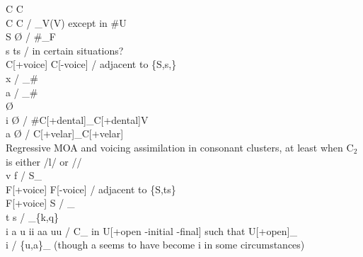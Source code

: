 \documentclass[11pt]{article}
\begin{document}
C\textipa{:} \textrightarrow\hspace{0pt} C \\
C \textrightarrow\hspace{0pt} C\textipa{:} / _V(\textellipsis V) except in \#U \\
S \textrightarrow\hspace{0pt} \O\hspace{0pt} / \#_F \\
s \textrightarrow\hspace{0pt} ts / in certain situations? \\
C[+voice] \textrightarrow\hspace{0pt} C[-voice] / adjacent to \{S,s,\} \\
 \textrightarrow\hspace{0pt} x  / _\# \\
 \textrightarrow\hspace{0pt} a / _\# \\
 \textrightarrow\hspace{0pt} \O\hspace{0pt} \\
i \textrightarrow\hspace{0pt} \O\hspace{0pt} / \#C[+dental]_C[+dental]V \\
a \textrightarrow\hspace{0pt} \O\hspace{0pt} / C[+velar]_C[+velar] \\
Regressive MOA and voicing assimilation in consonant clusters, at least when C$_2$ is either /l/ or // \\
v  \textrightarrow\hspace{0pt} f  / S_ \\
F[+voice] \textrightarrow\hspace{0pt} F[-voice] / adjacent to \{S,ts\} \\
F[+voice] \textrightarrow\hspace{0pt} S / _ \\
t \textrightarrow\hspace{0pt} s / _\{k,q\} \\
i a u \textrightarrow\hspace{0pt} ii aa uu / C_ in U[+open -initial -final] such that U[+open]_ \\
 \textrightarrow\hspace{0pt} i / \{u,a\}_ (though a seems to have become i in some circumstances) \\
\end{document}
